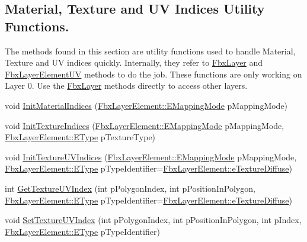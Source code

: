 \subsection*{Material, Texture and UV Indices Utility Functions.}
\label{_amgrpc3ba4f77c022cd0ffc78df514307fa12}%
The methods found in this section are utility functions used to handle Material, Texture and UV indices quickly. Internally, they refer to {\ttfamily \hyperlink{class_fbx_layer}{Fbx\+Layer}} and {\ttfamily \hyperlink{class_fbx_layer_element_u_v}{Fbx\+Layer\+Element\+UV}} methods to do the job. These functions are only working on Layer 0. Use the {\ttfamily \hyperlink{class_fbx_layer}{Fbx\+Layer}} methods directly to access other layers. \begin{DoxyCompactItemize}
\item 
void \hyperlink{class_fbx_mesh_afb22daa8a980e8946abed7cbf39ce4f0}{Init\+Material\+Indices} (\hyperlink{class_fbx_layer_element_a5a40e95db30ae9f94611dc3f1568af26}{Fbx\+Layer\+Element\+::\+E\+Mapping\+Mode} p\+Mapping\+Mode)
\item 
void \hyperlink{class_fbx_mesh_a7400d37014c8a84a5c356f1deef1761d}{Init\+Texture\+Indices} (\hyperlink{class_fbx_layer_element_a5a40e95db30ae9f94611dc3f1568af26}{Fbx\+Layer\+Element\+::\+E\+Mapping\+Mode} p\+Mapping\+Mode, \hyperlink{class_fbx_layer_element_a8c95c5cd880b56c776acd379bd86f42c}{Fbx\+Layer\+Element\+::\+E\+Type} p\+Texture\+Type)
\item 
void \hyperlink{class_fbx_mesh_a1b6a5d5371f59f8cda80f8cbcfefadf7}{Init\+Texture\+U\+V\+Indices} (\hyperlink{class_fbx_layer_element_a5a40e95db30ae9f94611dc3f1568af26}{Fbx\+Layer\+Element\+::\+E\+Mapping\+Mode} p\+Mapping\+Mode, \hyperlink{class_fbx_layer_element_a8c95c5cd880b56c776acd379bd86f42c}{Fbx\+Layer\+Element\+::\+E\+Type} p\+Type\+Identifier=\hyperlink{class_fbx_layer_element_a8c95c5cd880b56c776acd379bd86f42ca09829e6ecf512e7ae04d9ad8de1342fa}{Fbx\+Layer\+Element\+::e\+Texture\+Diffuse})
\item 
int \hyperlink{class_fbx_mesh_aa62de6d7883e85e0efda70d37329d98a}{Get\+Texture\+U\+V\+Index} (int p\+Polygon\+Index, int p\+Position\+In\+Polygon, \hyperlink{class_fbx_layer_element_a8c95c5cd880b56c776acd379bd86f42c}{Fbx\+Layer\+Element\+::\+E\+Type} p\+Type\+Identifier=\hyperlink{class_fbx_layer_element_a8c95c5cd880b56c776acd379bd86f42ca09829e6ecf512e7ae04d9ad8de1342fa}{Fbx\+Layer\+Element\+::e\+Texture\+Diffuse})
\item 
void \hyperlink{class_fbx_mesh_a1e74780d575f601d6e28c52ff36b555d}{Set\+Texture\+U\+V\+Index} (int p\+Polygon\+Index, int p\+Position\+In\+Polygon, int p\+Index, \hyperlink{class_fbx_layer_element_a8c95c5cd880b56c776acd379bd86f42c}{Fbx\+Layer\+Element\+::\+E\+Type} p\+Type\+Identifier)
\end{DoxyCompactItemize}
